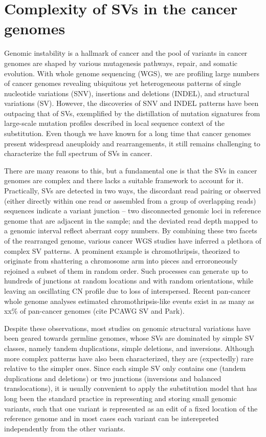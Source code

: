 \documentclass[phd,tocprelim]{cornell}
\begin{document}
\section{Complexity of SVs in the cancer genomes}
Genomic instability is a hallmark of cancer \cite{Hanahan2011-ni} and the pool of variants in cancer genomes are shaped by various mutagenesis pathways, repair, and somatic evolution. With whole genome sequencing (WGS), we are profiling large numbers of cancer genomes revealing ubiquitous yet heterogeneous patterns of single nucleotide variations (SNV), insertions and deletions (INDEL), and structural variations (SV). However, the discoveries of SNV and INDEL patterns have been outpacing that of SVs, exemplified by the distillation of mutation signatures from large-scale mutation profiles described in local sequence context of the substitution. Even though we have known for a long time that cancer genomes present widespread aneuploidy and rearrangements, it still remains challenging to characterize the full spectrum of SVs in cancer.

There are many reasons to this, but a fundamental one is that the SVs in cancer genomes are complex and there lacks a suitable framework to account for it. Practically, SVs are detected in two ways, the discordant read pairing or observed (either directly within one read or assembled from a group of overlapping reads) sequences indicate a variant junction -- two disconnected genomic loci in reference genome that are adjacent in the sample; and the deviated read depth mapped to a genomic interval reflect aberrant copy numbers. By combining these two facets of the rearranged genome, various cancer WGS studies have inferred a plethora of complex SV patterns. A prominent example is chromothripsis, theorized to originate from shattering a chromosome arm into pieces and erroroneously rejoined a subset of them in random order. Such processes can generate up to hundreds of junctions at random locations and with random orientations, while leaving an oscillating CN profile due to loss of interspersed. Recent pan-cancer whole genome analyses estimated chromothripsis-like events exist in as many as xx\% of pan-cancer genomes (cite PCAWG SV and Park).

Despite these observations, most studies on genomic structural variations have been geared towards germline genomes, whose SVs are dominated by simple SV classes, namely tandem duplications, simple deletions, and inversions. Although more complex patterns have also been characterized, they are (expectedly) rare relative to the simpler ones. Since each simple SV only contains one (tandem duplications and deletions) or two junctions (inversions and balanced translocations), it is usually convenient to apply the substitution model that has long been the standard practice in representing and storing small genomic variants, such that one variant is represented as an edit of a fixed location of the reference genome and in most cases each variant can be interepreted independently from the other variants.
\end{document}
